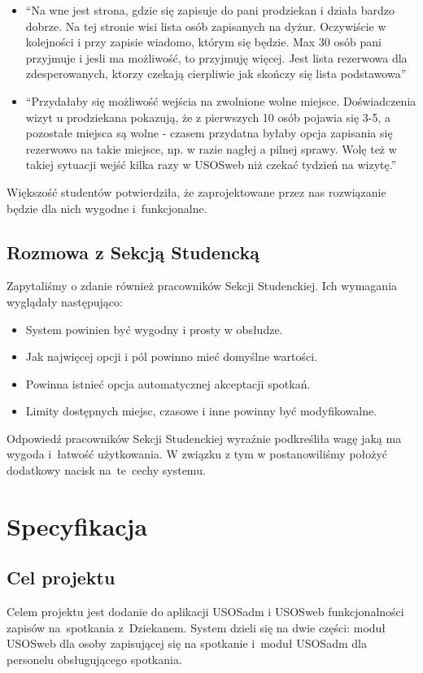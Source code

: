 \documentclass[licencjacka]{pracamgr}
\begin{document}
\begin{itemize}
\begin{itemize}
\item \enquote{Na wne jest strona, gdzie się zapisuje do pani prodziekan i działa bardzo dobrze. Na tej stronie wisi lista osób zapisanych na dyżur. Oczywiście w kolejności i przy zapisie wiadomo, którym się będzie. Max 30 osób pani przyjmuje i jesli ma możliwość, to przyjmuję więcej. Jest lista rezerwowa dla zdesperowanych, ktorzy czekają cierpliwie jak skończy się lista podstawowa}
\item \enquote{Przydałaby się możliwość wejścia na zwolnione wolne miejsce. Doświadczenia wizyt u prodziekana pokazują, że z pierwszych 10 osób pojawia się 3-5, a pozostałe miejsca są wolne - czasem przydatna byłaby opcja zapisania się rezerwowo na takie miejsce, np. w razie nagłej a pilnej sprawy.  Wolę też w takiej sytuacji wejść kilka razy w USOSweb niż czekać tydzień na wizytę.}
\end{itemize}

\end{itemize}
Większość studentów potwierdziła, że zaprojektowane przez nas rozwiązanie będzie dla nich wygodne i~funkcjonalne.
 
\section{Rozmowa z Sekcją Studencką}
Zapytaliśmy o zdanie również pracowników Sekcji Studenckiej. Ich wymagania wyglądały następująco:
\begin{itemize}
\setlength\itemsep{0,05em}
    \item System powinien być wygodny i prosty w obsłudze.
    \item Jak najwięcej opcji i pól powinno mieć domyślne wartości.
    \item Powinna istnieć opcja automatycznej akceptacji spotkań.
    \item Limity dostępnych miejsc, czasowe i inne powinny być modyfikowalne.
\end{itemize}
Odpowiedź pracowników Sekcji Studenckiej wyraźnie podkreśliła wagę jaką ma wygoda i~łatwość użytkowania. W związku z tym w postanowiliśmy położyć dodatkowy nacisk na~te~cechy systemu.


\chapter{Specyfikacja} \label{chap:specyfikacja}

\section{Cel projektu}
Celem projektu jest dodanie do aplikacji USOSadm i USOSweb funkcjonalności zapisów na~spotkania z~Dziekanem. System dzieli się na dwie części: moduł USOSweb dla osoby zapisującej się na spotkanie i~moduł USOSadm dla personelu obsługującego spotkania.
\end{document}
